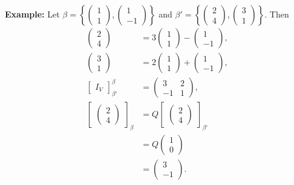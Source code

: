 \documentclass[12pt]{article}
\begin{document}
\noindent\textbf{Example:} Let $\beta = \left\{\begin{pmatrix}
1 \\ 1
\end{pmatrix}, \begin{pmatrix}
1 \\ -1
\end{pmatrix}\right\}$ and $\beta ' = \left\{ \begin{pmatrix}
2 \\ 4
\end{pmatrix}, \begin{pmatrix}
3 \\ 1
\end{pmatrix}\right\}$. Then \begin{align*}
    \begin{pmatrix}
    2 \\ 4
    \end{pmatrix} &= 3 \begin{pmatrix}
    1 \\ 1
    \end{pmatrix} - \begin{pmatrix}
    1 \\ -1
    \end{pmatrix}, \\
    \begin{pmatrix}
    3 \\ 1
    \end{pmatrix} &= 2 \begin{pmatrix}
    1 \\ 1
    \end{pmatrix} + \begin{pmatrix}
    1 \\ -1
    \end{pmatrix}, \\
    \begin{bmatrix}
    I_V
    \end{bmatrix}_{\beta '}^\beta &= \begin{pmatrix}
    3 & 2 \\ -1 & 1
    \end{pmatrix}, \\
    \begin{bmatrix}
    \begin{pmatrix}
    2 \\ 4
    \end{pmatrix}
    \end{bmatrix}_\beta &= Q \begin{bmatrix}
    \begin{pmatrix}
    2 \\ 4
    \end{pmatrix}
    \end{bmatrix}_{\beta '} \\ 
    &= Q \begin{pmatrix}
    1 \\ 0
    \end{pmatrix} \\
    &= \begin{pmatrix}
    3 \\ -1
    \end{pmatrix}.
\end{align*}
\end{document}
